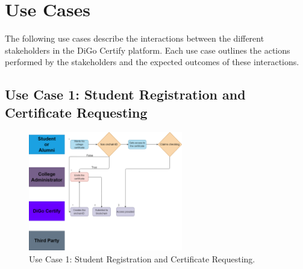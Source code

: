 \section{Use Cases}\label{sec:use-cases}

The following use cases describe the interactions between the different stakeholders in the DiGo Certify platform. Each use case outlines the actions performed by the stakeholders and the expected outcomes of these interactions.

\subsection{Use Case 1: Student Registration and Certificate Requesting}

\begin{figure}[H]
    \centering
    \includegraphics[width=0.6\textwidth, height=0.6\textheight, keepaspectratio]{final-report/assets/certificate-requesting.drawio.png}
    \caption{Use Case 1: Student Registration and Certificate Requesting.}
    \label{fig:use-case-1}
\end{figure}

